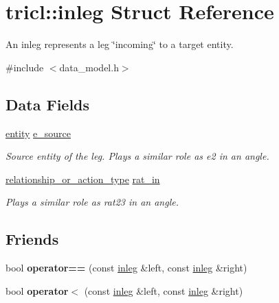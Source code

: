 \hypertarget{structtricl_1_1inleg}{}\section{tricl\+:\+:inleg Struct Reference}
\label{structtricl_1_1inleg}


An inleg represents a leg \char`\"{}incoming\char`\"{} to a target entity.  




{\ttfamily \#include $<$data\+\_\+model.\+h$>$}

\subsection*{Data Fields}
\begin{DoxyCompactItemize}
\item 
\mbox{\label{structtricl_1_1inleg_a6bdf67f9629e590cebfa4b87d30cf4c6}} 
\hyperlink{namespacetricl_a57273122278e8b301844e2a2e1f0742f}{entity} \hyperlink{structtricl_1_1inleg_a6bdf67f9629e590cebfa4b87d30cf4c6}{e\+\_\+source}
\begin{DoxyCompactList}\small\item\em Source entity of the leg. Plays a similar role as {\ttfamily e2} in an angle. \end{DoxyCompactList}\item 
\mbox{\label{structtricl_1_1inleg_a5119f9bdfc64539b95279288762b39e3}} 
\hyperlink{namespacetricl_a2d01894944fb58a8fedc0912a48d13f8}{relationship\+\_\+or\+\_\+action\+\_\+type} \hyperlink{structtricl_1_1inleg_a5119f9bdfc64539b95279288762b39e3}{rat\+\_\+in}
\begin{DoxyCompactList}\small\item\em Plays a similar role as {\ttfamily rat23} in an angle. \end{DoxyCompactList}\end{DoxyCompactItemize}
\subsection*{Friends}
\begin{DoxyCompactItemize}
\item 
\mbox{\label{structtricl_1_1inleg_a2882c00597e94a9fb19cde857cfe5003}} 
bool {\bfseries operator==} (const \hyperlink{structtricl_1_1inleg}{inleg} \&left, const \hyperlink{structtricl_1_1inleg}{inleg} \&right)
\item 
\mbox{\label{structtricl_1_1inleg_a8ddd31813cdcbb1b7c88d51fcd01cd23}} 
bool {\bfseries operator$<$} (const \hyperlink{structtricl_1_1inleg}{inleg} \&left, const \hyperlink{structtricl_1_1inleg}{inleg} \&right)
\end{DoxyCompactItemize}


